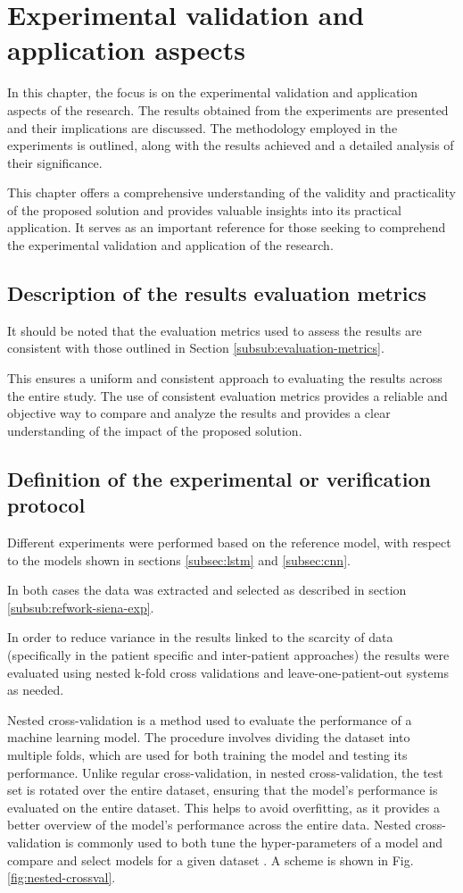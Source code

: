 \chapter{Experimental validation and application aspects}
In this chapter, the focus is on the experimental validation and application aspects of the research. The results obtained from the experiments are presented and their implications are discussed. The methodology employed in the experiments is outlined, along with the results achieved and a detailed analysis of their significance. 

This chapter offers a comprehensive understanding of the validity and practicality of the proposed solution and provides valuable insights into its practical application. It serves as an important reference for those seeking to comprehend the experimental validation and application of the research.

\section{Description of the results evaluation metrics}
It should be noted that the evaluation metrics used to assess the results are consistent with those outlined in Section \ref{subsub:evaluation-metrics}. 

This ensures a uniform and consistent approach to evaluating the results across the entire study. 
The use of consistent evaluation metrics provides a reliable and objective way to compare and analyze the results and provides a clear understanding of the impact of the proposed solution.

\section{Definition of the experimental or verification protocol}
Different experiments were performed based on the reference model, with respect to the models shown in sections \ref{subsec:lstm} and \ref{subsec:cnn}.

In both cases the data was extracted and selected as described in section \ref{subsub:refwork-siena-exp}.

In order to reduce variance in the results linked to the scarcity of data (specifically in the patient specific and inter-patient approaches) the results were evaluated using nested k-fold cross validations and leave-one-patient-out systems as needed.

Nested cross-validation is a method used to evaluate the performance of a machine learning model. The procedure involves dividing the dataset into multiple folds, which are used for both training the model and testing its performance. Unlike regular cross-validation, in nested cross-validation, the test set is rotated over the entire dataset, ensuring that the model's performance is evaluated on the entire dataset. This helps to avoid overfitting, as it provides a better overview of the model's performance across the entire data. Nested cross-validation is commonly used to both tune the hyper-parameters of a model and compare and select models for a given dataset \cite{jacopo_repossi_tutorial_2022}. A scheme is shown in Fig. \ref{fig:nested-crossval}.

